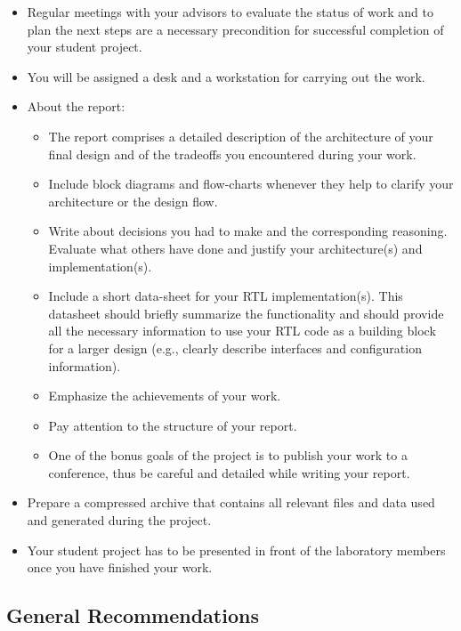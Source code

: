 \documentclass[12pt,english]{TCLsem}
\begin{document}
\begin{itemize}

\item Regular meetings with your advisors to evaluate the status of work and to plan the next steps are a necessary precondition for successful completion of your student project.
\item You will be assigned a desk and a workstation for carrying out the work.

\item About the report:
  \begin{itemize}
  \item The report comprises a detailed description of the architecture of your final design and of the tradeoffs you encountered during your work.
  \item Include block diagrams and flow-charts whenever they help to clarify your architecture or the design flow. 
  \item Write about decisions you had to make and the corresponding reasoning. Evaluate what others have done and justify your architecture(s) and implementation(s). 
  \item Include a short data-sheet for your RTL implementation(s). This datasheet should briefly summarize the functionality and should provide all the necessary information to use your RTL code as a building block for a larger design (e.g., clearly describe interfaces and configuration information).
  \item Emphasize the achievements of your work.
  \item Pay attention to the structure of your report.
  \item One of the bonus goals of the project is to publish your work to a conference, thus be careful and detailed while writing your report. 
  \end{itemize}

\item Prepare a compressed archive that contains all relevant files and data used and generated during the project.

\item Your student project has to be presented in front of the laboratory members once you have finished your work.

\end{itemize}


\subsection{General Recommendations}
\end{document}
